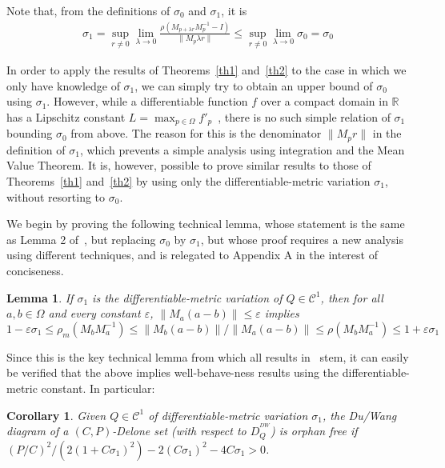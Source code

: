 \documentclass[11pt]{article}
\newtheorem{lemma}[theorem]{Lemma}
\newtheorem{corollary}[theorem]{Corollary}
\newcommand{\e}{\varepsilon}
\newcommand{\s}{\sigma}
\renewcommand{\O}{\Omega}
\newcommand{\C}{\mathcal{C}}
\begin{document}
Note that, from the definitions of $\s_0$ and $\s_1$, it is
\begin{eqnarray*}
	\s_1 =  \displaystyle{\sup_{r\ne 0} \lim_{\lambda\rightarrow 0}\frac{ \rho\left( M_{p+\lambda r}  M_p^{-1} - I \right) }{ \|M_p \lambda r\| } }  \le \displaystyle{\sup_{r\ne 0} \lim_{\lambda\rightarrow 0} \s_0} = \s_0
\end{eqnarray*}

In order to apply the results of Theorems~\ref{th1} and~\ref{th2} to the case in which we only have knowledge of $\s_1$, we can simply try to obtain an upper bound of $\s_0$ using $\s_1$. 
However, while a differentiable function $f$ over a compact domain in $\mathbb{R}$ has a Lipschitz constant $L=\max_{p\in\O} f'_p$~\cite{rudin-analysis}, 
	there is no such simple relation of  $\s_1$ bounding $\s_0$  from above. 
The reason for this is the denominator $\|M_p r\|$ in the definition of $\s_1$, which prevents a simple analysis using integration and the Mean Value Theorem. 
It is, however, possible to prove similar results to those of Theorems~\ref{th1} and~\ref{th2} by using only the differentiable-metric variation $\s_1$, without resorting to $\s_0$. 




	


We begin by proving the following technical lemma, whose statement is the same as Lemma 2 of~\cite{avd}, but replacing $\s_0$ by $\s_1$, 
	but whose proof requires a new analysis using different techniques, and is relegated to Appendix A in the interest of conciseness. 


\begin{lemma}\label{lem2}
	If $\s_1$ is the differentiable-metric variation  of $Q\in\C^1$, then for all $a,b\in\O$ and every constant $\e$, $\|M_a(a-b)\|\le \e$ implies
		\[ 1-\e\s_1 \le \rho_m(M_b M_a^{-1}) \le {\|M_b (a-b)\|}/{\|M_a (a-b)\|}  \le \rho(M_b M_a^{-1}) \le 1+\e\s_1 \]
\end{lemma}


Since this is the key technical lemma from which all results in~\cite{avd} stem, it can easily be verified that the above  implies well-behave-ness results using the differentiable-metric constant. 
In particular:

\begin{corollary}	\label{cor1}
Given $Q\in\C^1$ of differentiable-metric variation $\s_1$, 
	the Du/Wang diagram of a $(C,P)$-Delone set (with respect to $D_Q^{{ }^{DW}}$) is orphan free if 
	$(P/C)^2 / \left( 2 (1 + C\s_1)^2 \right) - 2(C\s_1)^2 - 4C\s_1 > 0$.
\end{corollary}
\end{document}
